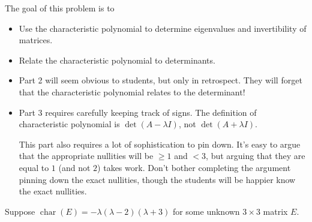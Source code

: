 \documentclass{problemset}
\DeclareMathOperator{\chr}{char}
\begin{document}
	\vspace{-.3cm}
	\question
	\begin{annotation}
		\begin{goals}

			The goal of this problem is to
			\begin{itemize}
				\item Use the characteristic polynomial to determine eigenvalues
					and invertibility of matrices.
				\item Relate the characteristic polynomial to determinants.
			\end{itemize}
		\end{goals}

		\begin{notes}
			\begin{itemize}
				\item Part 2 will seem obvious to students, but only
					in retrospect. They will forget that the characteristic polynomial
					relates to the determinant!
				\item Part 3 requires carefully keeping track of signs. The definition of characteristic
					polynomial is $\det(A-\lambda I)$, not $\det(A+\lambda I)$.

					This part also requires a lot of sophistication to pin down.
					It's easy to argue that the appropriate nullities will be $\geq 1$
					and $<3$, but arguing that they are equal to $1$ (and not $2$) takes work.
					Don't bother completing the argument pinning down the exact nullities,
					though the students will be happier know the exact nullities.
			\end{itemize}
		\end{notes}
	\end{annotation}
	\vspace{-.2cm}
	Suppose $\chr(E)=-\lambda(\lambda -2)(\lambda +3)$ for some unknown $3\times 3$
	matrix $E$.
\end{document}
